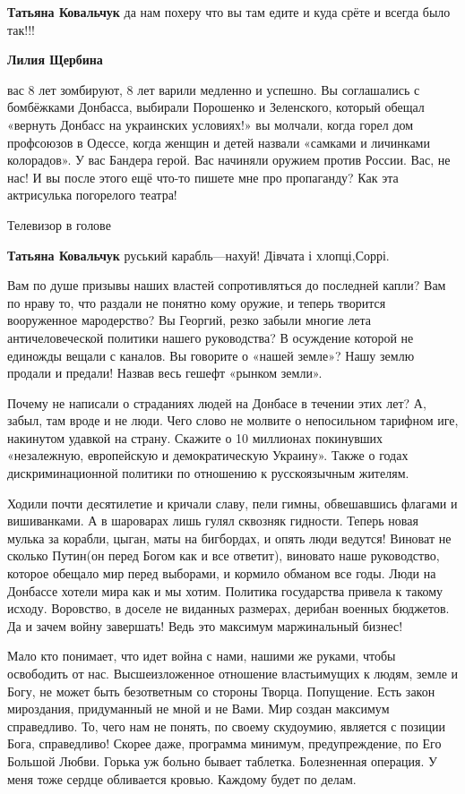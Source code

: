\begin{itemize}
\begin{itemize}
\textbf{Татьяна Ковальчук} да нам похеру что вы там едите и куда срёте и всегда было так!!!

\textbf{Лилия Щербина} 

вас 8 лет зомбируют, 8 лет варили медленно и успешно. Вы соглашались с
бомбёжками Донбасса, выбирали Порошенко и Зеленского, который обещал «вернуть
Донбасс на украинских условиях!» вы молчали, когда горел дом профсоюзов в
Одессе, когда женщин и детей назвали «самками и личинками колорадов». У вас
Бандера герой. Вас начиняли оружием против России. Вас, не нас! И вы после
этого ещё что-то пишете мне про пропаганду? Как эта актрисулька погорелого
театра!

Телевизор в голове

\textbf{Татьяна Ковальчук} руський карабль—нахуй!
Дівчата і хлопці,Соррі.
\end{itemize} %


Вам по душе призывы наших властей сопротивляться до последней капли? Вам по
нраву то, что раздали не понятно кому оружие, и теперь творится вооруженное
мародерство? Вы Георгий, резко забыли многие лета античеловеческой политики
нашего руководства? В осуждение которой не единожды вещали с каналов. Вы
говорите о «нашей земле»? Нашу землю продали и предали! Назвав весь гешефт
«рынком земли».

Почему не написали о страданиях людей на Донбасе в течении этих лет? А, забыл,
там вроде и не люди. Чего слово не молвите о непосильном тарифном иге,
накинутом удавкой на страну. Скажите о 10 миллионах покинувших «незалежную,
европейскую и демократическую Украину». Также о годах дискриминационной
политики по отношению к русскоязычным жителям.

Ходили почти десятилетие и кричали славу, пели гимны, обвешавшись флагами и
вишиванками. А в шароварах лишь гулял сквозняк гидности. Теперь новая мулька за
корабли, цыган, маты на бигбордах, и опять люди ведутся! Виноват не сколько
Путин(он перед Богом как и все ответит), виновато наше руководство, которое
обещало мир перед выборами, и кормило обманом все годы. Люди на Донбассе хотели
мира как и мы хотим. Политика государства привела к такому исходу. Воровство, в
доселе не виданных размерах, дерибан военных бюджетов. Да и зачем войну
завершать! Ведь это максимум маржинальный бизнес!

Мало кто понимает, что идет война с нами, нашими же руками, чтобы освободить от
нас. Высшеизложенное отношение властьимущих к людям, земле и Богу, не может
быть безответным со стороны Творца. Попущение. Есть закон мироздания,
придуманный не мной и не Вами. Мир создан максимум справедливо. То, чего нам не
понять, по своему скудоумию, является с позиции Бога, справедливо! Скорее даже,
программа минимум, предупреждение, по Его Большой Любви. Горька уж больно
бывает таблетка. Болезненная операция. У меня тоже сердце обливается кровью.
Каждому будет по делам.


\end{itemize}
